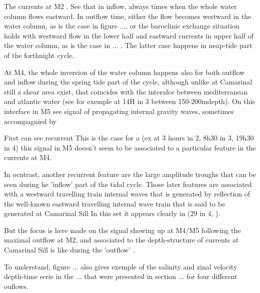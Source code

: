 The currents at M2 . See that in inflow, always times when the whole water column flows eastward. In outflow time, either the flow becomes westward in the water column, as is the case in figure ..., or the baroclinic exchange situation holds with westward flow in the lower half and eastward currents in upper half of the water column, as is the case in ... . The latter case happens in neap-tide part of the forthnight cycle.

At M4, the whole inversion of the water column happens also for both outflow and inflow during the spring tide part of the cycle, although unlike at Camarinal still a shear area exist, that coincides with the interafce between mediterranean and atlantic water (see for exemple at 14H in 3 between 150-200mdepth). On this interface in M5 see signal of propagating internal gravity waves, sometimes accompagnied by 

First can see recurrent This is the case for a (ex at 3 hours in 2, 8h30 in 3, 19h30 in 4) this signal in M5 doesn't seem to be associated to a particular feature in the currents at M4. 

In ocntrast, another recurrent feature are the large amplitude troughs that can be seen during he 'inflow' part of the tidal cycle. Those later features are associated with a westward travelling train internal waves that is generated by reflection of the well-known eastward travelling internal wave train that is said to be generated at Camarinal Sill In this set it appears clearly in (29 in 4, ). 


But the focus is here made on the signal showing up at M4/M5 following the maximal outflow at M2, and associated to the depth-structure of currents at Camarinal Sill is like during the 'outflow' .

To understand, figure ... also gives exemple of the salinity and zinal velocity depth-time serie in the ... that were presented in section ... for four different ouflows. 

